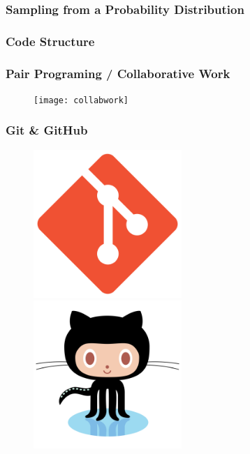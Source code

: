 \documentclass{beamer}
\begin{document}
\begin{frame}
\frametitle{Sampling from a Probability Distribution}
\end{frame}

\begin{frame}
\frametitle{Code Structure}
\begin{figure}
    
\end{figure}
\end{frame}

\begin{frame}
\frametitle{Pair Programing / Collaborative Work}
\begin{figure}
    \texttt{[image: collabwork]}
\end{figure}
\end{frame}

\begin{frame}
\frametitle{Git \& GitHub}
\begin{figure}
\includegraphics[width=0.5\textwidth]{gitlogo}
\includegraphics[width=0.5\textwidth]{octocat}
\end{figure}
\end{frame}
\end{document}
